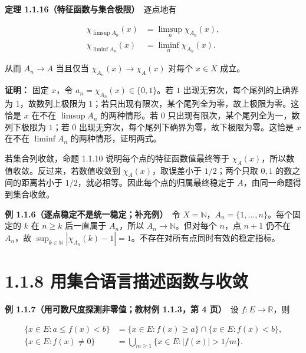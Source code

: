 \documentclass[11pt,a4paper]{article}
\begin{document}
\textbf{定理 1.1.16（特征函数与集合极限）}　逐点地有

\begin{equation*}
\begin{aligned}
\chi_{\limsup A_n}(x)&=\limsup_n\chi_{A_n}(x),\\
\chi_{\liminf A_n}(x)&=\liminf_n\chi_{A_n}(x).
\end{aligned}\tag{1.1.21}
\end{equation*}

从而 \(A_n\to A\) 当且仅当 \(\chi_{A_n}(x)\to\chi_A(x)\) 对每个
\(x\in X\) 成立。

\textbf{证明：} 固定 \(x\)，令 \(a_n=\chi_{A_n}(x)\in\{0,1\}\)。若 \(1\)
出现无穷次，每个尾列的上确界为 \(1\)，故数列上极限为
\(1\)；若只出现有限次，某个尾列全为零，故上极限为零。这恰是 \(x\) 在不在
\(\limsup A_n\) 的两种情形。若 \(0\)
只出现有限次，某个尾列全为一，数列下极限为 \(1\)；若 \(0\)
出现无穷次，每个尾列下确界为零，故下极限为零。这恰是 \(x\) 在不在
\(\liminf A_n\) 的两种情形，证明两式。

若集合列收敛，命题 1.1.10 说明每个点的特征函数值最终等于
\(\chi_A(x)\)，所以数值收敛。反过来，若数值收敛到
\(\chi_A(x)\)，取误差小于 \(1/2\)；两个只取 \(0,1\) 的数之间的距离若小于
\(1/2\)，就必相等。因此每个点的归属最终稳定于
\(A\)，由同一命题得到集合收敛。

\textbf{例 1.1.6（逐点稳定不是统一稳定；补充例）}　令
\(X=\mathbb N\)，\(A_n=\{1,\ldots,n\}\)。每个固定的 \(k\) 在 \(n\ge k\)
后一直属于 \(A_n\)，所以 \(A_n\to\mathbb N\)。但对每个 \(n\)，点 \(n+1\)
仍不在 \(A_n\)，故
\(\sup_{k\in\mathbb N}|\chi_{A_n}(k)-1|=1\)。不存在对所有点同时有效的稳定指标。

\section[\S{}1.1.8
用集合语言描述函数与收敛]{1.1.8
用集合语言描述函数与收敛}\label{ux7528ux96c6ux5408ux8bedux8a00ux63cfux8ff0ux51fdux6570ux4e0eux6536ux655b}

\textbf{例 1.1.7（用可数尺度探测非零值；教材例 1.1.3，第 4 页）}　设
\(f:E\to\mathbb R\)，则

\begin{equation*}
\begin{aligned}
\{x\in E:a\le f(x)<b\}
 &=\{x\in E:f(x)\ge a\}\cap\{x\in E:f(x)<b\},\\
\{x\in E:f(x)\ne0\}
 &=\bigcup_{m\ge1}\{x\in E:|f(x)|>1/m\}.
\end{aligned}\tag{1.1.22}
\end{equation*}
\end{document}
